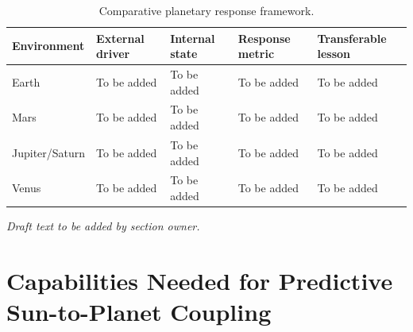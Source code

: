 \documentclass[
  draft
]{agujournal2025}
\begin{document}

\begin{table}[h]
\caption{Comparative planetary response framework.}
\label{tab:comparative-planetary-response}
\centering
\begin{tabular}{p{} p{} p{} p{} p{}}
\hline
Environment & External driver & Internal state & Response metric & Transferable lesson \\
\hline
Earth & To be added & To be added & To be added & To be added \\
Mars & To be added & To be added & To be added & To be added \\
Jupiter/Saturn & To be added & To be added & To be added & To be added \\
Venus & To be added & To be added & To be added & To be added \\
\hline
\end{tabular}
\end{table}

\noindent\textit{Draft text to be added by section owner.}

\section{Capabilities Needed for Predictive Sun-to-Planet Coupling}
\end{document}
